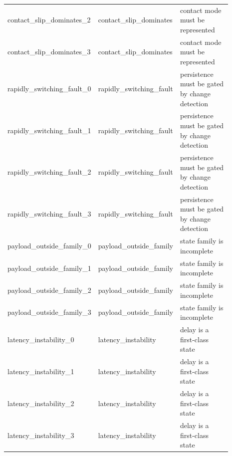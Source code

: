 \documentclass{article}
\begin{document}
\begin{center}
\begin{longtable}{p{0.26\linewidth}p{0.25\linewidth}p{0.38\linewidth}}
contact\_slip\_dominates\_2 & contact\_slip\_dominates & contact mode must be represented\\
contact\_slip\_dominates\_3 & contact\_slip\_dominates & contact mode must be represented\\
rapidly\_switching\_fault\_0 & rapidly\_switching\_fault & persistence must be gated by change detection\\
rapidly\_switching\_fault\_1 & rapidly\_switching\_fault & persistence must be gated by change detection\\
rapidly\_switching\_fault\_2 & rapidly\_switching\_fault & persistence must be gated by change detection\\
rapidly\_switching\_fault\_3 & rapidly\_switching\_fault & persistence must be gated by change detection\\
payload\_outside\_family\_0 & payload\_outside\_family & state family is incomplete\\
payload\_outside\_family\_1 & payload\_outside\_family & state family is incomplete\\
payload\_outside\_family\_2 & payload\_outside\_family & state family is incomplete\\
payload\_outside\_family\_3 & payload\_outside\_family & state family is incomplete\\
latency\_instability\_0 & latency\_instability & delay is a first-class state\\
latency\_instability\_1 & latency\_instability & delay is a first-class state\\
latency\_instability\_2 & latency\_instability & delay is a first-class state\\
latency\_instability\_3 & latency\_instability & delay is a first-class state\\
\bottomrule
\end{longtable}
\normalsize
\end{center}
\end{document}
